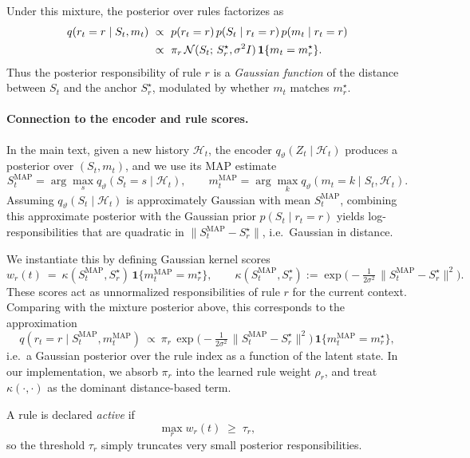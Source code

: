 \documentclass{article} %
\newcommand{\revise}[1]{#1}
\begin{document}
\revise{Under this mixture, the posterior over rules factorizes as
\begin{align}
q(r_t = r \mid S_t, m_t)
&~\propto~
p(r_t = r)\,p(S_t \mid r_t = r)\,p(m_t \mid r_t = r) \\
&~\propto~
\pi_r\,\mathcal N(S_t;\,S_r^\star,\sigma^2 I)\,\mathbf{1}\{m_t = m_r^\star\}. \notag
\end{align}
Thus the posterior responsibility of rule $r$ is a \emph{Gaussian function} of the distance between $S_t$ and the anchor $S_r^\star$, modulated by whether $m_t$ matches $m_r^\star$.}
\revise{\paragraph{Connection to the encoder and rule scores.}
In the main text, given a new history $\mathcal H_t$, the encoder $q_\vartheta(Z_t \mid \mathcal H_t)$ produces a posterior over $(S_t,m_t)$, and we use its MAP estimate
\[
S_t^{\text{MAP}} = \arg\max_s q_\vartheta(S_t=s\mid \mathcal H_t),\qquad
m_t^{\text{MAP}} = \arg\max_k q_\vartheta(m_t=k\mid S_t,\mathcal H_t).
\]
Assuming $q_\vartheta(S_t \mid \mathcal H_t)$ is approximately Gaussian with mean $S_t^{\text{MAP}}$, combining this approximate posterior with the Gaussian prior $p(S_t \mid r_t=r)$ yields log-responsibilities that are quadratic in $\|S_t^{\text{MAP}} - S_r^\star\|$, i.e.\ Gaussian in distance.}

\revise{We instantiate this by defining Gaussian kernel scores
\[
w_r(t)
~=~ \kappa(S_t^{\text{MAP}}, S_r^\star)\,\mathbf{1}\{m_t^{\text{MAP}} = m_r^\star\},
\qquad
\kappa(S_t^{\text{MAP}}, S_r^\star)
:= \exp\!\Big(-\tfrac{1}{2\sigma^2}\,\|S_t^{\text{MAP}} - S_r^\star\|^2\Big).
\]
These scores act as unnormalized responsibilities of rule $r$ for the current context. Comparing with the mixture posterior above, this corresponds to the approximation
\[
q(r_t = r \mid S_t^{\text{MAP}}, m_t^{\text{MAP}})
~\propto~
\pi_r\,\exp\!\Big(-\tfrac{1}{2\sigma^2}\,\|S_t^{\text{MAP}} - S_r^\star\|^2\Big)\,\mathbf{1}\{m_t^{\text{MAP}} = m_r^\star\},
\]
i.e.\ a Gaussian posterior over the rule index as a function of the latent state. In our implementation, we absorb $\pi_r$ into the learned rule weight $\rho_r$, and treat $\kappa(\cdot,\cdot)$ as the dominant distance-based term.}

\revise{A rule is declared \emph{active} if
\[
\max_r w_r(t) \;\ge\; \tau_r,
\]
so the threshold $\tau_r$ simply truncates very small posterior responsibilities.}
\end{document}
